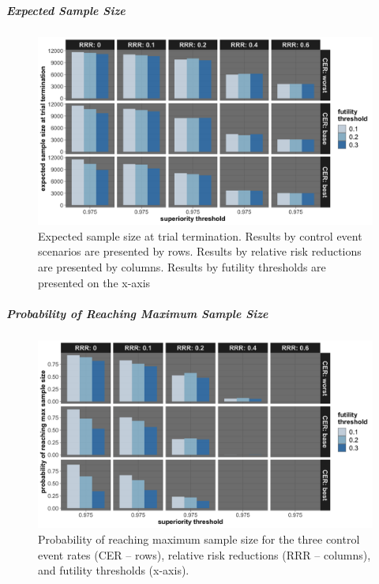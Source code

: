\documentclass[]{article}
\let\oldsubparagraph\subparagraph
\renewcommand{\subparagraph}[1]{\oldsubparagraph{#1}\mbox{}}
\begin{document}
\clearpage

\hypertarget{expected-sample-size-2}{%
\subparagraph{Expected Sample Size}\label{expected-sample-size-2}}

\begin{figure}
  \caption{Expected sample size at trial termination. Results by control event scenarios are presented by rows. Results
  by relative risk reductions are presented by columns. Results by futility thresholds are presented on the x-axis}
  \includegraphics{../p1_plots/batch_size_nb_3000/exp_sample_size_p1.png}
\end{figure}

\clearpage

\hypertarget{probability-of-reaching-maximum-sample-size-2}{%
\subparagraph{Probability of Reaching Maximum Sample
Size}\label{probability-of-reaching-maximum-sample-size-2}}

\begin{figure}
  \caption{Probability of reaching maximum sample size for the three control event rates (CER – rows), relative
  risk reductions (RRR – columns), and futility thresholds (x-axis).}
  \includegraphics{../p1_plots/batch_size_nb_3000/prob_reach_max_size_p1.png}
\end{figure}
\end{document}

